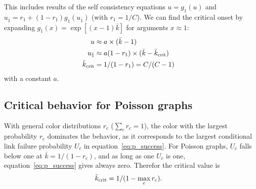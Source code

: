 \documentclass[aps, pre, onecolumn, a4paper, floatfix]{revtex4}
\begin{document}
This includes results of the self consistency equations $u=g_1(u)$ and 
$u_{\bar 1}=r_1+(1-r_1)g_1(u_{\bar 1})$ (with $r_1=1/C$).
We can find the critical onset by expanding $g_1(x)=\exp[(x-1){\bar k}]$ for arguments $x\approx 1$: 
\begin{align}
u &\approx a \times ({\bar k}-1)\\
u_{\bar 1} &\approx a (1-r_1)\times ({\bar k}-{\bar k}_{\rm crit})\\
{\bar k}_{\rm crit} &= 1/(1-r_1) = C/(C-1)
\end{align}
with a constant $a$.








\subsection{Critical behavior for Poisson graphs}

With general color distributions $r_c$ ($\sum_c r_c =1$), the color with the largest probability 
$r_c$ dominates 
the behavior, as it corresponds to the largest conditional link failure probability $U_{\bar c}$
in equation~\ref{eq:p_success}. For Poisson graphs, $U_{\bar c}$ 
falls below one at ${\bar k}=1/(1-r_c)$, and as long as one $U_{\bar c}$ is one, equation~\ref{eq:p_success}
gives always zero. Therefor the critical value is 
\begin{align}
{\bar k}_{\rm crit}=1/(1-\max_c r_c).
\end{align}
\end{document}
